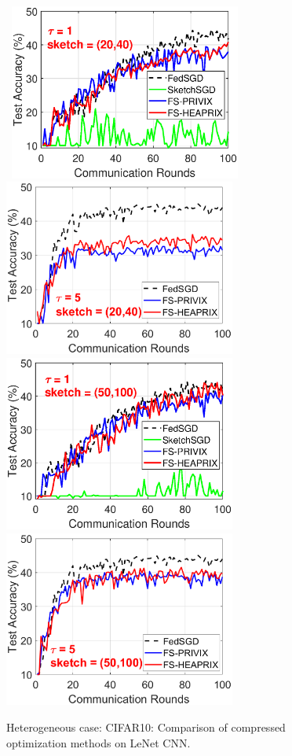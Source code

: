 \documentclass[11pt]{article}
\begin{document}
\begin{figure}[h]
	\begin{center}
		\mbox{%
\includegraphics[width=3.0in]{CIFAR_figures/cifar_local1_sketch20_iid0_test_acc.eps} 
		\includegraphics[width=3.0in]{CIFAR_figures/cifar_local5_sketch20_iid0_test_acc.eps}
		}
		\mbox{%
		\includegraphics[width=3.0in]{CIFAR_figures/cifar_local1_sketch50_iid0_test_acc.eps}
		\includegraphics[width=3.0in]{CIFAR_figures/cifar_local5_sketch50_iid0_test_acc.eps}
		}
	\end{center}
	\caption{Heterogeneous case: CIFAR10: Comparison of compressed optimization methods on LeNet CNN.}
    \label{fig:CIFAR-heter}
\end{figure}
\end{document}
